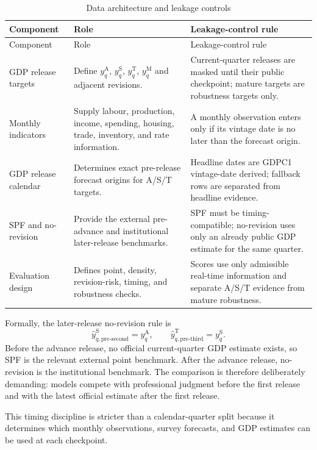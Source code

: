 \documentclass[12pt]{article}
\newcommand{\Arel}{\mathrm{A}}
\newcommand{\Srel}{\mathrm{S}}
\newcommand{\Trel}{\mathrm{T}}
\newcommand{\Mrel}{\mathrm{M}}
\begin{document}
\begingroup
\small
\setlength{\tabcolsep}{3pt}
\setlength{\LTleft}{0pt}
\setlength{\LTright}{0pt}
\begin{longtable}{L{2.8cm}L{3.5cm}L{8.4cm}}
\caption{Data architecture and leakage controls}\label{tab:data_architecture}\\
\toprule
Component & Role & Leakage-control rule \\
\midrule
\endfirsthead
\toprule
Component & Role & Leakage-control rule \\
\midrule
\endhead
GDP release targets & Define $y_q^{\Arel}$, $y_q^{\Srel}$, $y_q^{\Trel}$, $y_q^{\Mrel}$ and adjacent revisions. & Current-quarter releases are masked until their public checkpoint; mature targets are robustness targets only. \\
Monthly indicators & Supply labour, production, income, spending, housing, trade, inventory, and rate information. & A monthly observation enters only if its vintage date is no later than the forecast origin. \\
GDP release calendar & Determines exact pre-release forecast origins for A/S/T targets. & Headline dates are GDPC1 vintage-date derived; fallback rows are separated from headline evidence. \\
SPF and no-revision & Provide the external pre-advance and institutional later-release benchmarks. & SPF must be timing-compatible; no-revision uses only an already public GDP estimate for the same quarter. \\
Evaluation design & Defines point, density, revision-risk, timing, and robustness checks. & Scores use only admissible real-time information and separate A/S/T evidence from mature robustness. \\
\bottomrule
\end{longtable}
\endgroup

Formally, the later-release no-revision rule is
\[
\widehat y_{q,\mathrm{pre\text{-}second}}^{\Srel}=y_q^{\Arel},\qquad
\widehat y_{q,\mathrm{pre\text{-}third}}^{\Trel}=y_q^{\Srel}.
\]
Before the advance release, no official current-quarter GDP estimate exists, so SPF is the relevant external point benchmark. After the advance release, no-revision is the institutional benchmark. The comparison is therefore deliberately demanding: models compete with professional judgment before the first release and with the latest official estimate after the first release.

This timing discipline is stricter than a calendar-quarter split because it determines which monthly observations, survey forecasts, and GDP estimates can be used at each checkpoint.
\end{document}
